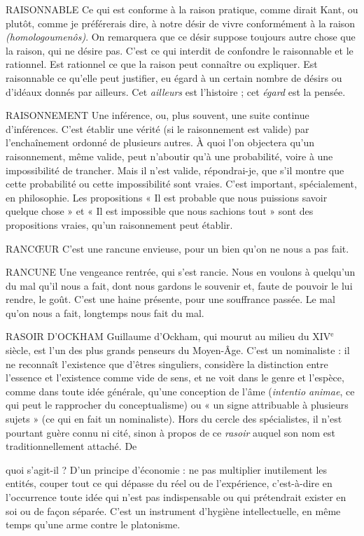 RAISONNABLE Ce qui est conforme à la raison pratique, comme dirait
Kant, ou plutôt, comme je préférerais dire, à notre désir de
vivre conformément à la raison {\it (homologoumenôs)}. On remarquera que ce désir
suppose toujours autre chose que la raison, qui ne désire pas. C’est ce qui
interdit de confondre le raisonnable et le rationnel. Est rationnel ce que la
raison peut connaître ou expliquer. Est raisonnable ce qu’elle peut justifier, eu
égard à un certain nombre de désirs ou d’idéaux donnés par ailleurs. Cet
{\it ailleurs} est l’histoire ; cet {\it égard} est la pensée.

RAISONNEMENT Une inférence, ou, plus souvent, une suite continue d’inférences.
C’est établir une vérité (si le raisonnement est
valide) par l’enchaînement ordonné de plusieurs autres. À quoi l’on objectera
qu’un raisonnement, même valide, peut n’aboutir qu’à une probabilité, voire à
une impossibilité de trancher. Mais il n’est valide, répondrai-je, que s’il montre
que cette probabilité ou cette impossibilité sont vraies. C’est important, spécialement,
en philosophie. Les propositions « Il est probable que nous puissions
savoir quelque chose » et « Il est impossible que nous sachions tout » sont des
propositions vraies, qu’un raisonnement peut établir.

RANCŒUR C'est une rancune envieuse, pour un bien qu’on ne nous a pas
fait.

RANCUNE Une vengeance rentrée, qui s’est rancie. Nous en voulons à
quelqu'un du mal qu’il nous a fait, dont nous gardons le souvenir
et, faute de pouvoir le lui rendre, le goût. C’est une haine présente, pour
une souffrance passée. Le mal qu’on nous a fait, longtemps nous fait du mal.

RASOIR D'OCKHAM Guillaume d’Ockham, qui mourut au milieu du
{\footnotesize XIV$^\text{e}$} siècle, est l’un des plus grands penseurs du
Moyen-Âge. C’est un nominaliste : il ne reconnaît l'existence que d’êtres singuliers,
considère la distinction entre l’essence et l'existence comme vide de sens,
et ne voit dans le genre et l’espèce, comme dans toute idée générale, qu’une
conception de l’âme ({\it intentio animae}, ce qui peut le rapprocher du conceptualisme)
ou « un signe attribuable à plusieurs sujets » (ce qui en fait un nominaliste).
Hors du cercle des spécialistes, il n’est pourtant guère connu ni cité,
sinon à propos de ce {\it rasoir} auquel son nom est traditionnellement attaché. De

quoi s'agit-il ? D’un principe d’économie : ne pas multiplier inutilement les
entités, couper tout ce qui dépasse du réel ou de l'expérience, c’est-à-dire en
l'occurrence toute idée qui n’est pas indispensable ou qui prétendrait exister en
soi ou de façon séparée. C’est un instrument d’hygiène intellectuelle, en même
temps qu’une arme contre le platonisme.

